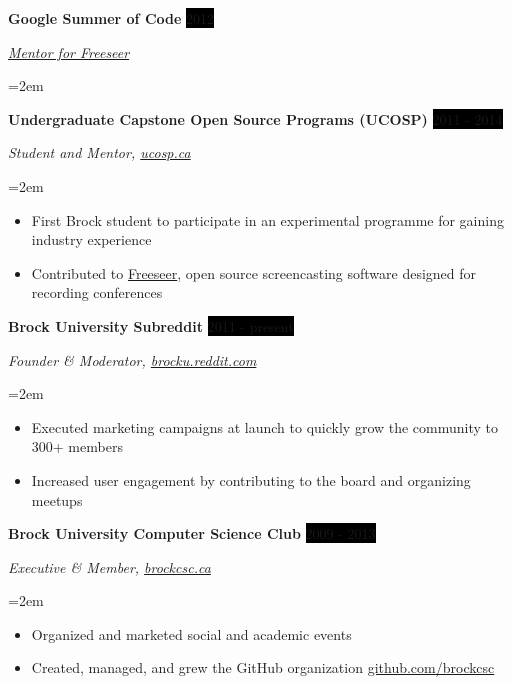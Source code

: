 \documentclass[paper=a4,fontsize=11pt]{scrartcl} %
\newcommand{\sepspace}{\vspace*{1em}}     %
\newcommand{\EducationEntry}[4]{
    \noindent \textbf{#1} \hfill        %
    \colorbox{Black}{
      \parbox{8.5em}{
      \hfill\color{White}#2}} \par      %
    \noindent \textit{#3} \par          %
    \noindent\hangindent=2em\hangafter=0 \small #4 %
    \normalsize \par}
\newcommand{\OrganizationEntry}[4]{         %
    \noindent \textbf{#1} \hfill            %
    \colorbox{Black}{\color{White}#2} \par  %
    \noindent \textit{#3} \par              %
    \noindent\hangindent=2em\hangafter=0 \small #4 %
    \normalsize \par}
\begin{document}
\OrganizationEntry{Google Summer of Code}{2012}
{\href{https://www.google-melange.com/archive/gsoc/2011}{Mentor for Freeseer}} %
{}

\OrganizationEntry{Undergraduate Capstone Open Source Programs (UCOSP)}{2011 - 2014}
{Student and Mentor, \href{http://ucosp.ca/}{ucosp.ca}}
{
  \begin{itemize} \itemsep -1pt %
    \item First Brock student to participate in an experimental programme for gaining industry experience
    \item Contributed to \href{http://freeseer.readthedocs.io/}{Freeseer}, open source screencasting software designed for recording conferences
  \end{itemize}
}
\sepspace

\OrganizationEntry{Brock University Subreddit}{2011 - present}
{Founder \& Moderator, \href{https://brocku.reddit.com/}{brocku.reddit.com}}
{
  \begin{itemize} \itemsep -1pt
    \item Executed marketing campaigns at launch to quickly grow the community to 300+ members
    \item Increased user engagement by contributing to the board and organizing meetups
  \end{itemize}
}
\sepspace

\OrganizationEntry{Brock University Computer Science Club}{2009 - 2013}
{Executive \& Member, \href{https://brockcsc.ca/}{brockcsc.ca}}
{
  \begin{itemize} \itemsep -1pt
    \item Organized and marketed social and academic events
    \item Created, managed, and grew the GitHub organization \href{https://github.com/brockcsc}{github.com/brockcsc} %
  \end{itemize}
}
\sepspace
\end{document}
